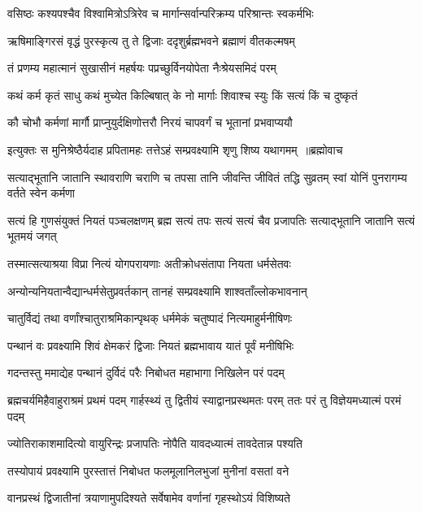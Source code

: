 \twolineshloka
{वसिष्ठः कश्यपश्चैव विश्वामित्रोऽत्रिरेव च}
{मार्गान्सर्वान्परिक्रम्य परिश्रान्तः स्वकर्मभिः}


\twolineshloka
{ऋषिमाङ्गिरसं वृद्धं पुरस्कृत्य तु ते द्विजाः}
{ददृशुर्ब्रह्मभवने ब्रह्माणं वीतकल्मषम्}


\twolineshloka
{तं प्रणम्य महात्मानं सुखासीनं महर्षयः}
{पप्रच्छुर्विनयोपेता नैःश्रेयसमिदं परम्}


\twolineshloka
{कथं कर्म कृतं साधु कथं मुच्येत किल्बिषात्}
{के नो मार्गाः शिवाश्च स्युः किं सत्यं किं च दुष्कृतं}


\twolineshloka
{कौ चोभौ कर्मणां मार्गौ प्राप्नुयुर्दक्षिणोत्तरौ}
{निरयं चापवर्गं च भूतानां प्रभवाप्ययौ}


\threelineshloka
{इत्युक्तः स मुनिश्रेष्ठैर्यदाह प्रपितामहः}
{तत्तेऽहं सम्प्रवक्ष्यामि शृणु शिष्य यथागमम् ॥ब्रह्मोवाच}
{}


\threelineshloka
{सत्याद्भूतानि जातानि स्थावराणि चराणि च}
{तपसा तानि जीवन्ति जीवितं तद्धि सुव्रतम्}
{स्वां योनिं पुनरागम्य वर्तते स्वेन कर्मणा}


सत्यं हि गुणसंयुक्तं नियतं पञ्चलक्षणम्
\twolineshloka
{ब्रह्म सत्यं तपः सत्यं सत्यं चैव प्रजापतिः}
{सत्याद्भूतानि जातानि सत्यं भूतमयं जगत्}


\twolineshloka
{तस्मात्सत्याश्रया विप्रा नित्यं योगपरायणाः}
{अतीक्रोधसंतापा नियता धर्मसेतवः}


\twolineshloka
{अन्योन्यनियतान्वैद्यान्धर्मसेतुप्रवर्तकान्}
{तानहं सम्प्रवक्ष्यामि शाश्वताँल्लोकभावनान्}


\twolineshloka
{चातुर्विद्यं तथा वर्णांश्चातुराश्रमिकान्पृथक्}
{धर्ममेकं चतुष्पादं नित्यमाहुर्मनीषिणः}


\twolineshloka
{पन्थानं वः प्रवक्ष्यामि शिवं क्षेमकरं द्विजाः}
{नियतं ब्रह्मभावाय यातं पूर्वं मनीषिभिः}


\twolineshloka
{गदन्तस्तु ममाद्येह पन्थानं दुर्विदं परैः}
{निबोधत महाभागा निखिलेन परं पदम्}


\threelineshloka
{ब्रह्मचर्यमिहैवाहुराश्रमं प्रथमं पदम्}
{गार्हस्थ्यं तु द्वितीयं स्याद्वानप्रस्थमतः परम्}
{ततः परं तु विज्ञेयमध्यात्मं परमं पदम्}


\twolineshloka
{ज्योतिराकाशमादित्यो वायुरिन्द्रः प्रजापतिः}
{नोपैति यावदध्यात्मं तावदेतान्न पश्यति}


\twolineshloka
{तस्योपायं प्रवक्ष्यामि पुरस्तात्तं निबोधत}
{फलमूलानिलभुजां मुनीनां वसतां वने}


\twolineshloka
{वानप्रस्थं द्विजातीनां त्रयाणामुपदिश्यते}
{सर्वेषामेव वर्णानां गृहस्थोऽयं विशिष्यते}


